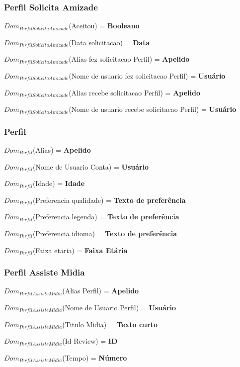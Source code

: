 \documentclass[12pt,a4paper]{article}
\newcommand{\createdomain}[3]{
    $Dom_{#1}$(#2) = {\bf #3}
}
\begin{document}
    \subsubsection{Perfil Solicita Amizade}
        \createdomain{Perfil Solicita Amizade}{Aceitou}{Booleano}

        \createdomain{Perfil Solicita Amizade}{Data solicitacao}{Data}

        \createdomain{Perfil Solicita Amizade}{Alias fez solicitacao Perfil}{Apelido}

        \createdomain{Perfil Solicita Amizade}{Nome de usuario fez solicitacao Perfil}{Usuário}

        \createdomain{Perfil Solicita Amizade}{Alias recebe solicitacao Perfil}{Apelido}

        \createdomain{Perfil Solicita Amizade}{Nome de usuario recebe solicitacao Perfil}{Usuário}


    \subsubsection{Perfil}
        \createdomain{Perfil}{Alias}{Apelido}

        \createdomain{Perfil}{Nome de Usuario Conta}{Usuário}

        \createdomain{Perfil}{Idade}{Idade}

        \createdomain{Perfil}{Preferencia qualidade}{Texto de preferência}

        \createdomain{Perfil}{Preferencia legenda}{Texto de preferência}

        \createdomain{Perfil}{Preferencia idioma}{Texto de preferência}

        \createdomain{Perfil}{Faixa etaria}{Faixa Etária}


    \subsubsection{Perfil Assiste Midia}
        \createdomain{Perfil Assiste Midia}{Alias Perfil}{Apelido}

        \createdomain{Perfil Assiste Midia}{Nome de Usuario Perfil}{Usuário}

        \createdomain{Perfil Assiste Midia}{Titulo Midia}{Texto curto}

        \createdomain{Perfil Assiste Midia}{Id Review}{ID}

        \createdomain{Perfil Assiste Midia}{Tempo}{Número}
\end{document}

